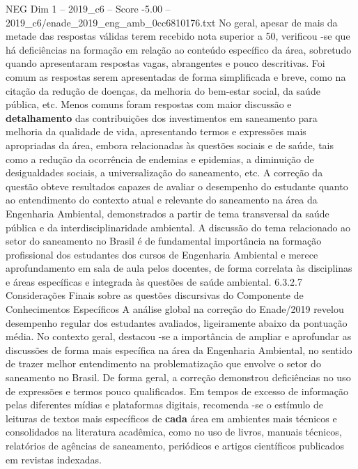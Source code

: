 \begin{textsample}{NEG Dim 1 – 2019\_c6 – Score -5.00 – 2019\_c6/enade\_2019\_eng\_amb\_0cc6810176.txt}
No geral, apesar de mais da metade das respostas válidas terem recebido nota superior a 50, verificou -se que há deficiências na formação em relação ao conteúdo específico da área, sobretudo quando apresentaram respostas vagas, abrangentes e pouco descritivas.
Foi comum as respostas serem apresentadas de forma simplificada e breve, como na citação da redução de doenças, da melhoria do bem-estar social, da saúde pública, etc.
Menos comuns foram respostas com maior discussão e \textbf{detalhamento} das contribuições dos investimentos em saneamento para melhoria da qualidade de vida, apresentando termos e expressões mais apropriadas da área, embora relacionadas às questões sociais e de saúde, tais como a redução da ocorrência de endemias e epidemias, a diminuição de desigualdades sociais, a universalização do saneamento, etc.
A correção da questão obteve resultados capazes de avaliar o desempenho do estudante quanto ao entendimento do contexto atual e relevante do saneamento na área da Engenharia Ambiental, demonstrados a partir de tema transversal da saúde pública e da interdisciplinaridade ambiental.
A discussão do tema relacionado ao setor do saneamento no Brasil é de fundamental importância na formação profissional dos estudantes dos cursos de Engenharia Ambiental e merece aprofundamento em sala de aula pelos docentes, de forma correlata às disciplinas e áreas específicas e integrada às questões de saúde ambiental. 6.3.2.7 Considerações Finais sobre as questões discursivas do Componente de Conhecimentos Específicos A análise global na correção do Enade/2019 revelou desempenho regular dos estudantes avaliados, ligeiramente abaixo da pontuação média.
No contexto geral, destacou -se a importância de ampliar e aprofundar as discussões de forma mais específica na área da Engenharia Ambiental, no sentido de trazer melhor entendimento na problematização que envolve o setor do saneamento no Brasil.
De forma geral, a correção demonstrou deficiências no uso de expressões e termos pouco qualificados.
Em tempos de excesso de informação pelas diferentes mídias e plataformas digitais, recomenda -se o estímulo de leituras de textos mais específicos de \textbf{cada} área em ambientes mais técnicos e consolidados na literatura acadêmica, como no uso de livros, manuais técnicos, relatórios de agências de saneamento, periódicos e artigos científicos publicados em revistas indexadas.

\end{textsample}
